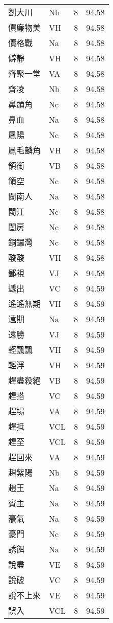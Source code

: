 \documentclass[twocolumn]{book}
\begin{document}
\begin{supertabular}{llrr}
劉大川 & Nb & 8 &  94.58\\
價廉物美 & VH & 8 &  94.58\\
價格戰 & Na & 8 &  94.58\\
僻靜 & VH & 8 &  94.58\\
齊聚一堂 & VA & 8 &  94.58\\
齊凌 & Nb & 8 &  94.58\\
鼻頭角 & Nc & 8 &  94.58\\
鼻血 & Na & 8 &  94.58\\
鳳陽 & Nc & 8 &  94.58\\
鳳毛麟角 & VH & 8 &  94.58\\
領銜 & VB & 8 &  94.58\\
領空 & Nc & 8 &  94.58\\
閩南人 & Na & 8 &  94.58\\
閩江 & Nc & 8 &  94.58\\
閨房 & Nc & 8 &  94.58\\
銅鑼灣 & Nc & 8 &  94.58\\
酸酸 & VH & 8 &  94.58\\
鄙視 & VJ & 8 &  94.58\\
遞出 & VC & 8 &  94.59\\
遙遙無期 & VH & 8 &  94.59\\
遠期 & Na & 8 &  94.59\\
遠勝 & VJ & 8 &  94.59\\
輕飄飄 & VH & 8 &  94.59\\
輕浮 & VH & 8 &  94.59\\
趕盡殺絕 & VB & 8 &  94.59\\
趕搭 & VC & 8 &  94.59\\
趕場 & VA & 8 &  94.59\\
趕抵 & VCL & 8 &  94.59\\
趕至 & VCL & 8 &  94.59\\
趕回來 & VA & 8 &  94.59\\
趙紫陽 & Nb & 8 &  94.59\\
趙王 & Na & 8 &  94.59\\
賓主 & Na & 8 &  94.59\\
豪氣 & Na & 8 &  94.59\\
豪門 & Nc & 8 &  94.59\\
誘餌 & Na & 8 &  94.59\\
說盡 & VE & 8 &  94.59\\
說破 & VC & 8 &  94.59\\
說不上來 & VE & 8 &  94.59\\
誤入 & VCL & 8 &  94.59\\

\end{supertabular}
\end{document}
